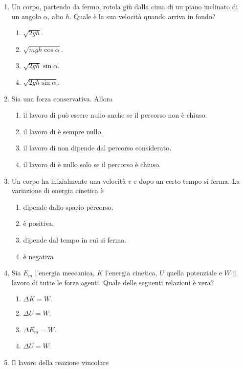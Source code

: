 \documentclass{article}
\begin{document}
\begin{enumerate}
  \item Un corpo, partendo da fermo, rotola giù dalla cima di un piano inclinato di un angolo $\alpha$, alto $h$. Quale è la sua velocità quando arriva in fondo?
  \begin{enumerate}[label=\Alph*.]
    \item $\sqrt{2gh}$.
    \item $\sqrt{mgh\cos\alpha}$.
    \item $\sqrt{2gh}\sin\alpha$.
    \item $\sqrt{2gh\sin\alpha}$.
  \end{enumerate}
  \item Sia  una forza conservativa. Allora
  \begin{enumerate}[label=\Alph*.]
    \item il lavoro di  può essere nullo anche se il percorso non è chiuso.
    \item il lavoro di  è sempre nullo.
    \item il lavoro di  non dipende dal percorso considerato.
    \item il lavoro di  è nullo solo se il percorso è chiuso.
  \end{enumerate}
  \item Un corpo ha inizialmente una velocità $v$ e dopo un certo tempo si ferma. La variazione di energia cinetica è
  \begin{enumerate}[label=\Alph*.]
    \item dipende dallo spazio percorso.
    \item è positiva.
    \item dipende dal tempo in cui si ferma.
    \item è negativa
  \end{enumerate}
  \item Sia $E_m$ l'energia meccanica, $K$ l'energia cinetica, $U$ quella potenziale e $W$ il lavoro di tutte le forze agenti. Quale delle seguenti relazioni è vera?
  \begin{enumerate}[label=\Alph*.]
    \item $\Delta K=W.$
    \item $\Delta U=W$.
    \item $\Delta E_m=W$.
    \item $\Delta U=W$.
  \end{enumerate}
  \item Il lavoro della reazione vincolare
  \begin{enumerate}[label=\Alph*.]

\end{enumerate}
\end{enumerate}
\end{document}

